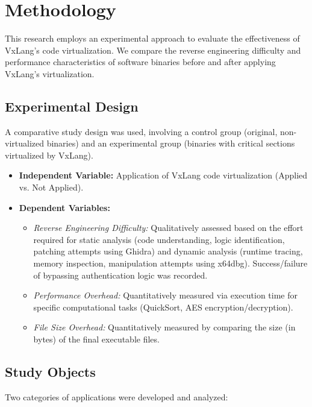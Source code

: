 \section{Methodology} \label{sec:methodology}
This research employs an experimental approach to evaluate the effectiveness of VxLang's code virtualization. We compare the reverse engineering difficulty and performance characteristics of software binaries before and after applying VxLang's virtualization.

\subsection{Experimental Design}
A comparative study design was used, involving a control group (original, non-virtualized binaries) and an experimental group (binaries with critical sections virtualized by VxLang).

\begin{itemize}
    \item \textbf{Independent Variable:} Application of VxLang code virtualization (Applied vs. Not Applied).
    \item \textbf{Dependent Variables:}
        \begin{itemize}
            \item \textit{Reverse Engineering Difficulty:} Qualitatively assessed based on the effort required for static analysis (code understanding, logic identification, patching attempts using Ghidra) and dynamic analysis (runtime tracing, memory inspection, manipulation attempts using x64dbg). Success/failure of bypassing authentication logic was recorded.
            \item \textit{Performance Overhead:} Quantitatively measured via execution time for specific computational tasks (QuickSort, AES encryption/decryption).
            \item \textit{File Size Overhead:} Quantitatively measured by comparing the size (in bytes) of the final executable files.
        \end{itemize}
\end{itemize}

\subsection{Study Objects}
Two categories of applications were developed and analyzed:


